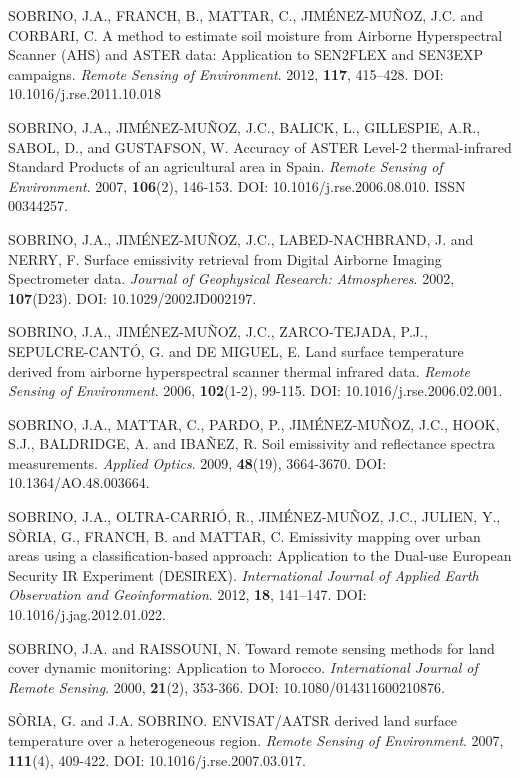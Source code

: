 \begin{thebibliography}{10}
 SOBRINO, J.A., FRANCH, B., MATTAR, C., JIMÉNEZ-MUÑOZ, J.C. and CORBARI, C. A method to estimate soil moisture from Airborne Hyperspectral Scanner (AHS) and ASTER data: Application to SEN2FLEX and SEN3EXP campaigns. \textit{Remote Sensing of Environment}. 2012, \textbf{117}, 415–428. DOI: 10.1016/j.rse.2011.10.018

 SOBRINO, J.A., JIMÉNEZ-MUÑOZ, J.C., BALICK, L., GILLESPIE, A.R., SABOL, D., and GUSTAFSON, W. Accuracy of ASTER Level-2 thermal-infrared Standard Products of an agricultural area in Spain. \textit{Remote Sensing of Environment}. 2007, \textbf{106}(2), 146-153. DOI: 10.1016/j.rse.2006.08.010. ISSN 00344257.

 SOBRINO, J.A., JIMÉNEZ-MUÑOZ, J.C., LABED-NACHBRAND, J. and NERRY, F. Surface emissivity retrieval from Digital Airborne Imaging Spectrometer data. \textit{Journal of Geophysical Research: Atmospheres}. 2002, \textbf{107}(D23). DOI: 10.1029/2002JD002197.

 SOBRINO, J.A., JIMÉNEZ-MUÑOZ, J.C., ZARCO-TEJADA, P.J., SEPULCRE-CANTÓ, G. and DE MIGUEL, E. Land surface temperature derived from airborne hyperspectral scanner thermal infrared data. \textit{Remote Sensing of Environment}. 2006, \textbf{102}(1-2), 99-115. DOI: 10.1016/j.rse.2006.02.001.

 SOBRINO, J.A., MATTAR, C., PARDO, P., JIMÉNEZ-MUÑOZ, J.C., HOOK, S.J., BALDRIDGE, A. and IBAÑEZ, R. Soil emissivity and reflectance spectra measurements. \textit{Applied Optics}. 2009, \textbf{48}(19), 3664-3670. DOI: 10.1364/AO.48.003664.

 SOBRINO, J.A., OLTRA-CARRIÓ, R., JIMÉNEZ-MUÑOZ, J.C., JULIEN, Y., SÒRIA, G., FRANCH, B. and MATTAR, C. Emissivity mapping over urban areas using a classification-based approach: Application to the Dual-use European Security IR Experiment (DESIREX). \textit{International Journal of Applied Earth Observation and Geoinformation}. 2012, \textbf{18}, 141–147. DOI: 10.1016/j.jag.2012.01.022.

 SOBRINO, J.A. and RAISSOUNI, N. Toward remote sensing methods for land cover dynamic monitoring: Application to Morocco. \textit{International Journal of Remote Sensing}. 2000, \textbf{21}(2), 353-366. DOI: 10.1080/014311600210876.

 SÒRIA, G. and J.A. SOBRINO. ENVISAT/AATSR derived land surface temperature over a heterogeneous region. \textit{Remote Sensing of Environment}. 2007, \textbf{111}(4), 409-422. DOI: 10.1016/j.rse.2007.03.017.


\end{thebibliography}
